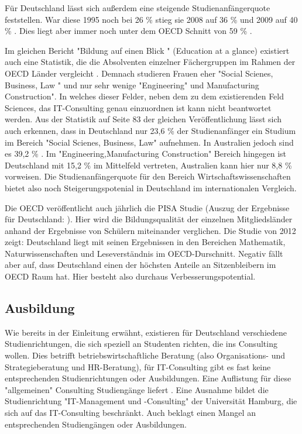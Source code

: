Für Deutschland lässt sich außerdem eine steigende Studienanfängerquote feststellen. War diese 1995 noch bei 26 \%  stieg sie 2008 auf 36 \%  und 2009 auf 40 \% . Dies liegt aber immer noch unter dem OECD Schnitt von 59 \% .

Im gleichen Bericht "Bildung auf einen Blick " (Education at a glance) existiert auch eine Statistik, die die Absolventen einzelner Fächergruppen im Rahmen der OECD Länder vergleicht \cite{oecd3}. Demnach studieren Frauen eher "Social Scienes, Business, Law " und nur sehr wenige "Engineering" und Manufacturing Construction". In welches dieser Felder, neben dem  zu dem existierenden Feld Sciences, das IT-Consulting genau einzuordnen ist kann nicht beantwortet werden. Aus der Statistik auf Seite 83 der gleichen Veröffentlichung lässt sich auch erkennen, dass in Deutschland nur 23,6 \% der Studienanfänger ein Studium im Bereich "Social Scienes, Business, Law" aufnehmen. In Australien jedoch sind es 39,2 \% . Im "Engineering,Manufacturing Construction" Bereich hingegen ist Deutschland mit 15,2 \% im Mittelfeld vertreten, Australien kann hier nur  8,8 \% vorweisen. Die Studienanfängerquote für den Bereich Wirtschaftswissenschaften bietet also noch Steigerungspotenial in Deutschland im internationalen Vergleich.

Die OECD veröffentlicht auch jährlich die PISA Studie (Auszug der Ergebnisse für Deutschland: \cite{pisa} ). Hier wird die Bildungsqualität der einzelnen Mitgliedsländer anhand der Ergebnisse von Schülern miteinander verglichen. Die Studie von 2012 zeigt: Deutschland liegt mit seinen Ergebnissen in den Bereichen Mathematik, Naturwissenschaften und Leseverständnis im OECD-Durschnitt. Negativ fällt aber auf, dass Deutschland einen der höchsten Anteile an Sitzenbleibern im OECD Raum hat. Hier besteht also durchaus Verbesserungspotential.

\subsection{Ausbildung}
Wie bereits in der Einleitung erwähnt, existieren für Deutschland verschiedene Studienrichtungen, die sich speziell an Studenten richten, die ins Consulting wollen. Dies betrifft betriebswirtschaftliche Beratung (also Organisations- und Strategieberatung und HR-Beratung), für IT-Consulting gibt es fast keine entsprechenden Studienrichtungen oder Ausbildungen.
Eine Auflistung für diese "allgemeinen" Consulting Studiengänge liefert \cite{NissenKlaukDeelmannMohe201209}. 
Eine Ausnahme bildet die Studienrichtung "IT-Management und -Consulting" der Universität Hamburg, die sich auf das IT-Consulting beschränkt. Auch \cite{IDSScheer} beklagt einen Mangel an entsprechenden Studiengängen oder Ausbildungen.

